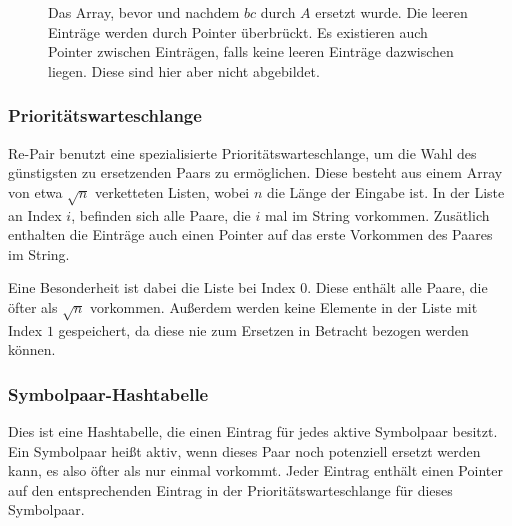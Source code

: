 \begin{figure}[H]
	\centering
	\caption{Das Array, bevor und nachdem $bc$ durch $A$ ersetzt wurde. Die leeren Einträge werden durch Pointer überbrückt. Es existieren auch Pointer zwischen Einträgen, falls keine leeren Einträge dazwischen liegen. Diese sind hier aber nicht abgebildet.}
\end{figure}

\subsubsection{Prioritätswarteschlange}

Re-Pair benutzt eine spezialisierte Prioritätswarteschlange, um die Wahl des günstigsten zu ersetzenden Paars zu ermöglichen. Diese besteht aus einem Array von etwa $\sqrt{n}$ verketteten Listen, wobei $n$ die Länge der Eingabe ist. In der Liste an Index $i$, befinden sich alle Paare, die $i$ mal im String vorkommen. Zusätlich enthalten die Einträge auch  einen Pointer auf das erste Vorkommen des Paares im String.

Eine Besonderheit ist dabei die Liste bei Index $0$. Diese enthält alle Paare, die öfter als $\sqrt{n}$ vorkommen. Außerdem werden keine Elemente in der Liste mit Index $1$ gespeichert, da diese nie zum Ersetzen in Betracht bezogen werden können.
 
\subsubsection{Symbolpaar-Hashtabelle}

Dies ist eine Hashtabelle, die einen Eintrag für jedes aktive Symbolpaar besitzt. Ein Symbolpaar heißt aktiv, wenn dieses Paar noch potenziell ersetzt werden kann, es also öfter als nur einmal vorkommt. Jeder Eintrag enthält einen Pointer auf den entsprechenden Eintrag in der Prioritätswarteschlange für dieses Symbolpaar.

